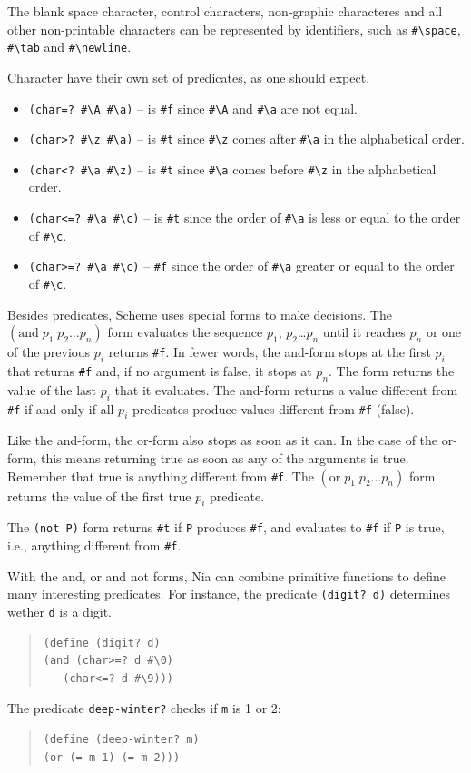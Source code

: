 \documentclass[a4paper,12pt]{book}
\begin{document}
The blank space character,  control
characters, non-graphic characteres
and all other non-printable characters
can be represented by
identifiers, such as \verb|#\space|,
\verb|#\tab| and \verb|#\newline|.

Character have their own set of
predicates, as one should expect.
\begin{itemize}
\item\verb|(char=? #\A #\a)| -- is \verb|#f|
since \verb|#\A| and \verb|#\a| are not equal.
\item\verb|(char>? #\z #\a)| -- is \verb|#t|
since \verb|#\z|  comes
after \verb|#\a| in the alphabetical order.
\item\verb|(char<? #\a #\z)| -- is \verb|#t|
since \verb|#\a| comes before \verb|#\z|
in the alphabetical order.
\item\verb|(char<=? #\a #\c)| -- is \verb|#t| since
the order of \verb|#\a| is less or equal to
the order of \verb|#\c|.
\item\verb|(char>=? #\a #\c)| -- \verb|#f| since
the order of \verb|#\a| greater or equal to the
order of \verb|#\c|.
\end{itemize}

Besides predicates, Scheme uses special forms
to make decisions. The $(\textrm{and}\; p_1\;
p_2\ldots p_n)$ form
evaluates the sequence $p_1$, $p_2$\ldots $p_n$
until it reaches $p_n$ or one of the previous
$p_i$ returns \verb|#f|. In fewer words,
the and-form stops at the first
$p_i$ that returns \verb|#f| and, if no
argument is false, it stops at $p_n$.
The form returns the value of the last
$p_i$ that it evaluates. The and-form
returns a value different from \verb|#f|
if and only if all $p_i$ predicates produce
values different from \verb|#f| (false).

Like the and-form, the or-form also stops
as soon as it can. In the case of the or-form,
this means returning true as soon as any
of the arguments is true. Remember that
true is anything different from \verb|#f|.
The  $(\textrm{or}\; p_1\;
p_2\ldots p_n)$ form returns the value
of the first true $p_i$ predicate.

The \verb|(not P)| form returns \verb|#t|
if \verb|P| produces \verb|#f|, and
evaluates to \verb|#f| if \verb|P| is true,
i.e., anything different from \verb|#f|.

With the and, or and not forms, Nia can
combine primitive functions to define
many interesting predicates. For instance,
the predicate \verb|(digit? d)| determines
wether \verb|d| is a digit.
\begin{quote}
\begin{verbatim}
(define (digit? d)
(and (char>=? d #\0)
   (char<=? d #\9)))
\end{verbatim}
\end{quote}
The predicate \verb|deep-winter?| checks if
\verb|m| is 1 or 2:
\begin{quote}
\begin{verbatim}
(define (deep-winter? m)
(or (= m 1) (= m 2)))
\end{verbatim}
\end{quote}
\end{document}
